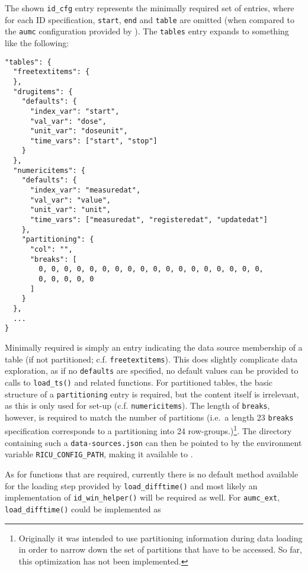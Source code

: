 \documentclass[
  notitle]{jss}
\begin{document}
The shown \texttt{id\_cfg} entry represents the minimally required set
of entries, where for each ID specification, \texttt{start},
\texttt{end} and \texttt{table} are omitted (when compared to the
\texttt{aumc} configuration provided by ). The \texttt{tables}
entry expands to something like the following:

\begin{verbatim}
"tables": {
  "freetextitems": {
  },
  "drugitems": {
    "defaults": {
      "index_var": "start",
      "val_var": "dose",
      "unit_var": "doseunit",
      "time_vars": ["start", "stop"]
    }
  },
  "numericitems": {
    "defaults": {
      "index_var": "measuredat",
      "val_var": "value",
      "unit_var": "unit",
      "time_vars": ["measuredat", "registeredat", "updatedat"]
    },
    "partitioning": {
      "col": "",
      "breaks": [
        0, 0, 0, 0, 0, 0, 0, 0, 0, 0, 0, 0, 0, 0, 0, 0, 0, 0,
        0, 0, 0, 0, 0
      ]
    }
  },
  ...
}
\end{verbatim}

Minimally required is simply an entry indicating the data source
membership of a table (if not partitioned; c.f. \texttt{freetextitems}).
This does slightly complicate data exploration, as if no
\texttt{defaults} are specified, no default values can be provided to
calls to \texttt{load\_ts()} and related functions. For partitioned
tables, the basic structure of a \texttt{partitioning} entry is
required, but the content itself is irrelevant, as this is only used for
set-up (c.f. \texttt{numericitems}). The length of \texttt{breaks},
however, is required to match the number of partitions (i.e.~a length 23
\texttt{breaks} specification corresponds to a partitioning into 24
row-groups.)\footnote{Originally it was intended to use partitioning
  information during data loading in order to narrow down the set of
  partitions that have to be accessed. So far, this optimization has not
  been implemented.}. The directory containing such a
\texttt{data-sources.json} can then be pointed to by the environment
variable \texttt{RICU\_CONFIG\_PATH}, making it available to .

As for functions that are required, currently there is no default method
available for the loading step provided by \texttt{load\_difftime()} and
most likely an implementation of \texttt{id\_win\_helper()} will be
required as well. For \texttt{aumc\_ext}, \texttt{load\_difftime()}
could be implemented as
\end{document}
